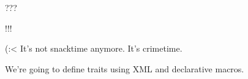 \documentclass{beamer}
\begin{document}
	\begin{frame}{???}
		\centering
		
	\end{frame}

	\begin{frame}{!!!}
		\centering
		
	\end{frame}

	\begin{frame}{(:<}
		It's not snacktime anymore. It's crimetime.

		We're going to define traits using XML and declarative macros.
	\end{frame}
\end{document}
